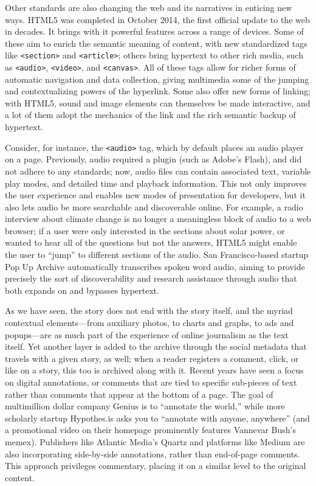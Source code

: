 Other standards are also changing the web and its narratives in enticing new ways. HTML5 was completed in October 2014, the first official update to the web in decades. It brings with it powerful features across a range of devices. Some of these aim to enrich the semantic meaning of content, with new standardized tags like \texttt{<section>} and \texttt{<article>}; others bring hypertext to other rich media, such as \texttt{<audio>}, \texttt{<video>}, and \texttt{<canvas>}. All of these tags allow for richer forms of automatic navigation and data collection, giving multimedia some of the jumping and contextualizing powers of the hyperlink. Some also offer new forms of linking; with HTML5, sound and image elements can themselves be made interactive, and a lot of them adopt the mechanics of the link and the rich semantic backup of hypertext.

Consider, for instance, the \texttt{<audio>} tag, which by default places an audio player on a page. Previously, audio required a plugin (such as Adobe's Flash), and did not adhere to any standards; now, audio files can contain associated text, variable play modes, and detailed time and playback information. This not only improves the user experience and enables new modes of presentation for developers, but it also lets audio be more searchable and discoverable online. For example, a radio interview about climate change is no longer a meaningless block of audio to a web browser; if a user were only interested in the sections about solar power, or wanted to hear all of the questions but not the answers, HTML5 might enable the user to ``jump'' to different sections of the audio. San Francisco-based startup Pop Up Archive automatically transcribes spoken word audio, aiming to provide precisely the sort of discoverability and research assistance through audio that both expands on and bypasses hypertext.

As we have seen, the story does not end with the story itself, and the myriad contextual elements---from auxiliary photos, to charts and graphs, to ads and popups---are as much part of the experience of online journalism as the text itself. Yet another layer is added to the archive through the social metadata that travels with a given story, as well; when a reader registers a comment, click, or like on a story, this too is archived along with it. Recent years have seen a focus on digital annotations, or comments that are tied to specific sub-pieces of text rather than comments that appear at the bottom of a page. The goal of multimillion dollar company Genius is to ``annotate the world,'' while more scholarly startup Hypothes.is asks you to ``annotate with anyone, anywhere'' (and a promotional video on their homepage prominently features Vannevar Bush's memex). Publishers like Atlantic Media's Quartz and platforms like Medium are also incorporating side-by-side annotations, rather than end-of-page comments. This approach privileges commentary, placing it on a similar level to the original content.

